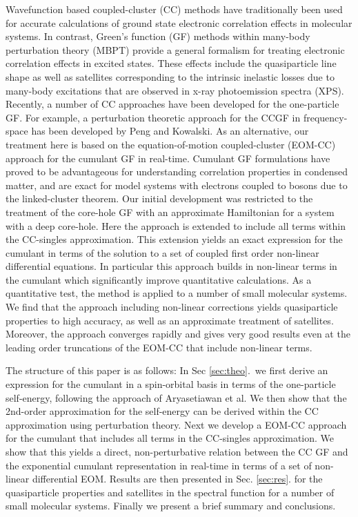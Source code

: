 \documentclass[aps,prb,twocolumn,groupaddress,floatfix]{revtex4}
\begin{document}
Wavefunction based coupled-cluster (CC) methods have traditionally been
used for accurate calculations of ground state electronic correlation effects
in molecular systems.\cite{Bartlett2009} In contrast, Green's function (GF)
methods within many-body perturbation theory (MBPT) provide a general
formalism for treating electronic correlation effects in
excited states.\cite{Hedin99review}
These effects include the quasiparticle line shape as well as satellites
corresponding to the intrinsic inelastic losses due to many-body excitations
that are observed in x-ray photoemission spectra (XPS).
Recently, a number of CC approaches have been developed for the one-particle
GF. For example, a perturbation theoretic approach for
the CCGF in frequency-space has been developed by
Peng and Kowalski.\cite{PengKowalski2016,PengKowalski2018}
As an alternative, our treatment here is based on the equation-of-motion
coupled-cluster (EOM-CC) approach for the
cumulant GF in real-time.
Cumulant GF formulations have proved to be advantageous for
understanding correlation properties in
condensed matter,\cite{Hedin99review,sky}
and are exact for model systems with electrons coupled to bosons due to
the linked-cluster theorem.\cite{langreth70}
Our initial development was restricted to the treatment of the
core-hole GF with an approximate Hamiltonian for a system
with a deep core-hole.\cite{RVKNKP}
Here the approach is extended to include all terms within the
CC-singles approximation. This extension yields an exact expression for the
cumulant in terms of the solution to a set of coupled first order
non-linear differential equations. 
In particular this approach builds in non-linear terms in the cumulant
which significantly improve quantitative calculations.
As a quantitative test, the method is applied to a number
of small molecular systems.  We find that the approach including
non-linear corrections yields quasiparticle properties to high accuracy,
as well as an approximate treatment of satellites. 
Moreover, the approach converges rapidly
and gives very good results even at the leading order
truncations of the EOM-CC that include non-linear terms.

The structure of this paper is as follows: In Sec \ref{sec:theo}.\
we first derive an expression for the cumulant in a spin-orbital basis in
terms of the one-particle self-energy,
following the approach of Aryasetiawan et al.\cite{PhysRevLett.77.2268}
We then show that the 2nd-order approximation
for the self-energy can be derived within the CC approximation
using perturbation theory.
Next we develop a EOM-CC approach for the cumulant that includes all terms
in the CC-singles approximation. We show that this yields
a direct, non-perturbative relation between the CC GF 
and the exponential cumulant representation in real-time in terms
of a set of non-linear differential EOM.
Results are then presented in Sec. \ref{sec:res}. for the quasiparticle properties and 
satellites in the spectral function for a number of
small molecular systems.
Finally we present a brief summary and conclusions.
\end{document}
